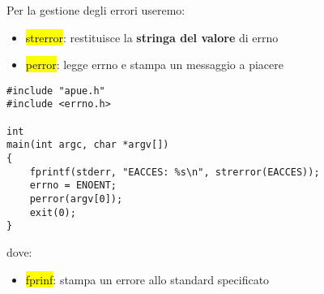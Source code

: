 Per la gestione degli errori useremo:

\begin{itemize}
	\item \hl{strerror}: restituisce la \textbf{stringa del valore} di errno
	\item \hl{perror}: legge errno e stampa un messaggio a piacere
\end{itemize}


\begin{lstlisting}
#include "apue.h"
#include <errno.h>

int
main(int argc, char *argv[])
{
	fprintf(stderr, "EACCES: %s\n", strerror(EACCES));
	errno = ENOENT;
	perror(argv[0]);
	exit(0);
}
\end{lstlisting}


dove:

\begin{itemize}
	\item \hl{fprinf}: stampa un errore allo standard specificato
\end{itemize}



% 